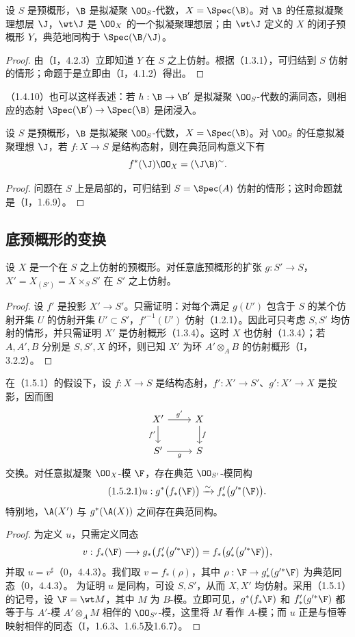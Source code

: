 设 $S$ 是预概形，$\B$ 是拟凝聚 $\OO_S$-代数，$X=\Spec(\B)$。对 $\B$ 的任意拟凝聚理想层 $\J$，$\wt\J$ 是 $\OO_X$ 的一个拟凝聚理想层；由 $\wt\J$ 定义的 $X$ 的闭子预概形 $Y$，典范地同构于 $\Spec(\B/\J)$。
\begin{proof}
由（I，4.2.3）立即知道 $Y$ 在 $S$ 之上仿射。根据（1.3.1），可归结到 $S$ 仿射的情形；命题于是立即由（I，4.1.2）得出。
\end{proof}
（1.4.10）也可以这样表述：若 $h:\B\to\B'$ 是拟凝聚 $\OO_S$-代数的满同态，则相应的态射
$\Spec(\B')\to\Spec(\B)$ 是闭浸入。

设 $S$ 是预概形，$\B$ 是拟凝聚 $\OO_S$-代数，$X=\Spec(\B)$。对 $\OO_S$ 的任意拟凝聚理想 $\J$，若 $f:X\to S$ 是结构态射，则在典范同构意义下有
\[
f^*(\J)\OO_X=(\J\B)^\sim.
\]
\begin{proof}
问题在 $S$ 上是局部的，可归结到 $S=\Spec(A)$ 仿射的情形；这时命题就是（I，1.6.9）。
\end{proof}

\subsection{底预概形的变换}
设 $X$ 是一个在 $S$ 之上仿射的预概形。对任意底预概形的扩张 $g:S'\to S$，
$X'=X_{(S')}=X\times_SS'$ 在 $S'$ 之上仿射。
\begin{proof}
设 $f'$ 是投影 $X'\to S'$。只需证明：对每个满足 $g(U')$ 包含于 $S$ 的某个仿射开集 $U$ 的仿射开集 $U'\subset S'$，$f'^{-1}(U')$ 仿射（1.2.1）。因此可只考虑 $S,S'$ 均仿射的情形，并只需证明 $X'$ 是仿射概形（1.3.4）。这时 $X$ 也仿射（1.3.4）；若 $A,A',B$ 分别是 $S,S',X$ 的环，则已知 $X'$ 为环 $A'\otimes_AB$ 的仿射概形（I，3.2.2）。
\end{proof}

在（1.5.1）的假设下，设 $f:X\to S$ 是结构态射，$f':X'\to S'$、$g':X'\to X$ 是投影，因而图
\[
\begin{tikzcd}
X' \arrow[r,"g'"] \arrow[d,"f'"'] & X \arrow[d,"f"]\\
S' \arrow[r,"g"'] & S
\end{tikzcd}
\]
交换。对任意拟凝聚 $\OO_X$-模 $\F$，存在典范 $\OO_{S'}$-模同构
\begin{equation}\tag{1.5.2.1}
u:g^*\bigl(f_*(\F)\bigr)\xrightarrow{\sim}f'_*\bigl(g'^*(\F)\bigr).
\end{equation}
特别地，$\A(X')$ 与 $g^*(\A(X))$ 之间存在典范同构。
\begin{proof}
为定义 $u$，只需定义同态
\[
v:f_*(\F)\longrightarrow g_*\bigl(f'_*\bigl(g'^*\F\bigr)\bigr)
=f_*\bigl(g'_*\bigl(g'^*\F\bigr)\bigr),
\]
并取 $u=v^\sharp$（0，4.4.3）。我们取 $v=f_*(\rho)$，其中
$\rho:\F\to g'_*(g'^*\F)$ 为典范同态（0，4.4.3）。
为证明 $u$ 是同构，可设 $S,S'$，从而 $X,X'$ 均仿射。采用（1.5.1）的记号，设 $\F=\wt M$，其中 $M$ 为 $B$-模。立即可见，$g^*(f_*\F)$ 和 $f'_*(g'^*\F)$ 都等于与 $A'$-模 $A'\otimes_AM$ 相伴的 $\OO_{S'}$-模，这里将 $M$ 看作 $A$-模；而 $u$ 正是与恒等映射相伴的同态（I，1.6.3、1.6.5及1.6.7）。
\end{proof}

